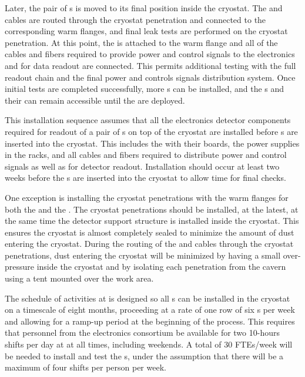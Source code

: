 Later, the pair of s is moved to its final position 
inside the cryostat. The 
and  cables are routed through the cryostat penetration and
connected to the corresponding warm flanges, and final leak tests are performed
on the cryostat penetration. At this point, the  is attached
to the warm flange and all of the cables and fibers required to provide 
power and control signals to the  electronics and for data
readout are connected. This permits additional testing with the full 
 readout chain and the final power and controls signals distribution
system. Once initial tests are completed successfully, more s
can be installed, and the s and their  
can remain accessible until the  are deployed.

This installation sequence assumes that all the  electronics detector 
components required for readout of a pair of s  on top of the cryostat 
are installed before s are inserted into the cryostat. This 
includes the  with their boards, the power supplies in 
the racks, and all cables and fibers required to distribute power and
control signals as well as for detector readout. Installation should occur at least two weeks before
the s are inserted into the cryostat to allow time for final checks. 

One exception
is installing the cryostat penetrations with the warm flanges
for both the  and the . The cryostat
penetrations should be installed, at the latest,
at the same time the detector support structure is installed
inside the cryostat. This ensures the cryostat is almost 
completely sealed to minimize the amount of dust 
entering the cryostat. During the routing of the  and
 cables through the cryostat penetrations, dust entering the cryostat will be minimized by having a small
over-pressure inside the cryostat and by isolating each penetration
from the cavern using a tent mounted over 
the work area.

The schedule of activities at  is designed so all 
s can be installed in the cryostat on a timescale of eight
months, proceeding at a rate of one row of six s per week and
allowing for a ramp-up period at the beginning of the process. This
requires that personnel from the  electronics consortium be available
for two \num{10}-hours shifts per day at  at all times, including weekends. A
total of 30 FTEs/week will be needed to install and test the s,
under the assumption that there will be a maximum of four shifts per person
per week. 

